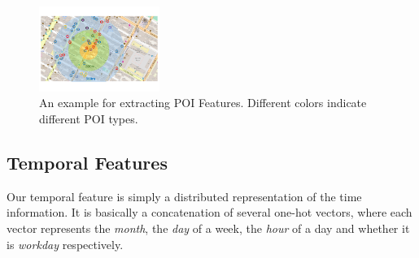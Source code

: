 \begin{figure}[t]
	\centering
	\includegraphics[width=0.35\textwidth]{figures/poi.pdf}
	\caption{{An example for extracting POI Features. Different colors indicate different POI types.}}
	\label{fig:poi}
\end{figure}


\subsection{Temporal Features}
Our temporal feature is simply a distributed representation of the time information.
It is basically a concatenation of several one-hot vectors, 
where each vector represents the \textit{month}, the \textit{day} of a week, the \textit{hour} of a day and whether it is \textit{workday} respectively. 


